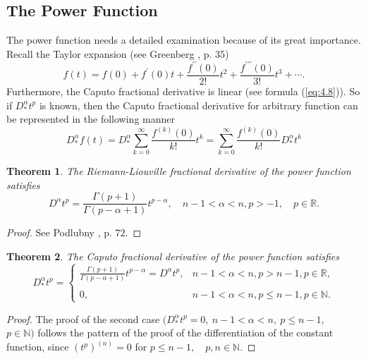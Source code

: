 \documentclass[a4paper,14pt,oneside]{book}
\theoremstyle{plain}
\newtheorem{thm}{Theorem}[section]
\theoremstyle{definition}
\theoremstyle{remark}
\begin{document}
\begin{center}
\begin{flushleft}
{\section{The Power Function}
The power function needs a detailed examination because of its great importance. Recall the Taylor expansion (see Greenberg \cite{bb17}, p. 35)
$$
f(t)=f(0)+f^{\prime}(0) t+\frac{f^{\prime \prime}(0)}{2 !} t^{2}+\frac{f^{\prime \prime \prime}(0)}{3 !} t^{3}+\cdots .
$$
Furthermore, the Caputo fractional derivative is linear (see formula (\ref{eq:4.8})). So if $D_{*}^{\alpha} t^{p}$ is known, then the Caputo fractional derivative for arbitrary function can be represented in the following manner
\begin{equation}\label{eq:5.1}
D_{*}^{\alpha} f(t)=D_{*}^{\alpha} \sum_{k=0}^{\infty} \frac{f^{(k)}(0)}{k !} t^{k}=\sum_{k=0}^{\infty} \frac{f^{(k)}(0)}{k !} D_{*}^{\alpha} t^{k}
\end{equation}
\begin{thm}
The Riemann-Liouville fractional derivative of the power function satisfies
\begin{equation}\label{eq:5.2}
D^{\alpha} t^{p}=\frac{\Gamma(p+1)}{\Gamma(p-\alpha+1)} t^{p-\alpha}, \quad n-1<\alpha<n, p>-1, \quad p \in \mathbb{R} .
\end{equation}
\end{thm}
\begin{proof}
See Podlubny \cite{bb22}, p. $72 .$
\end{proof}
\begin{thm}
The Caputo fractional derivative of the power function satisfies
\begin{equation}\label{eq:5.3}
D_{*}^{\alpha} t^{p}=\left\{\begin{array}{ll}
\frac{\Gamma(p+1)}{\Gamma(p-\alpha+1)} t^{p-\alpha}=D^{\alpha} t^{p}, & n-1<\alpha<n, p>n-1, p \in \mathbb{R}, \\ \\
0, & n-1<\alpha<n, p \leq n-1, p \in \mathbb{N} .
\end{array}\right.
\end{equation}
\end{thm}
\begin{proof}
The proof of the second case $(D_{*}^{\alpha} t^{p}=0, ~ n-1<\alpha<n, ~ p \leq n-1,$\\ $p \in \mathbb{N})$ follows the pattern of the proof of the differentiation of the constant function, since $\left(t^{p}\right)^{(n)}=0$ for $p \leq n-1, \quad  p, n \in \mathbb{N}$.


\end{proof}}
\end{flushleft}
\end{center}
\end{document}

